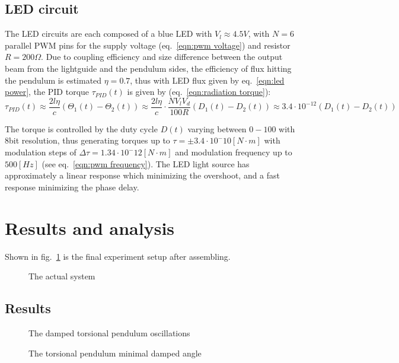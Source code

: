 \documentclass[\main/master.tex]{subfiles}
\begin{document}
\subsection{LED circuit}
The LED circuits are each composed of a blue LED with $V_l\approx 4.5V$, with $N=6$ parallel PWM pins for the supply voltage (eq.~\ref{eqn:pwm voltage}) and resistor $R = 200\Omega$. Due to coupling efficiency and size difference between the output beam from the lightguide and the pendulum sides, the efficiency of flux hitting the pendulum is estimated $\eta = 0.7$, thus with LED flux given by eq.~\ref{eqn:led power}, the PID torque $\tau_{PID}(t)$ is given by (eq.~\ref{eqn:radiation torque}):
\begin{equation}
\tau_{PID}(t) \approx \frac{2l\eta}{{c}} (\Theta_1(t) -\Theta_2(t)) \approx \frac{2l\eta}{{c}} \cdot\frac{N V_l V_d}{100R}(D_1(t) -D_2(t))  \approx   3.4\cdot 10^{-12}(D_1(t) -D_2(t)) 
\label{eqn:led torque}
\end{equation}
\par\noindent
The torque is controlled by the duty cycle $D(t)$ varying between $0-100$ with 8bit resolution, thus generating torques up to $\tau = \pm 3.4\cdot10^-{10} [N\cdot m]$ with modulation steps of $\Delta\tau = 1.34\cdot10^-{12} [N\cdot m]$ and modulation frequency up to $500[Hz]$ (see eq.~\ref{eqn:pwm frequency}). The LED light source has approximately a linear response which minimizing the overshoot, and a fast response minimizing the phase delay.

\section{Results and analysis} 
Shown in fig.~\ref{fig:actual system} is the final experiment setup after assembling.
\begin{figure}[htbp]
	\centering
	\caption[The actual system]{The actual system}
	\label{fig:actual system}
\end{figure}
\subsection{Results}

\begin{figure}[htbp]
	\centering
	\caption[The damped torsional pendulum oscillations]{The damped torsional pendulum oscillations}
	\label{fig:measured oscillation angle}
\end{figure}
\begin{figure}[htbp]
	\centering
	\caption[The torsional pendulum minimal damped angle]{The torsional pendulum minimal damped angle}
	\label{fig:measured oscillation angle 1}
\end{figure}
\end{document}
